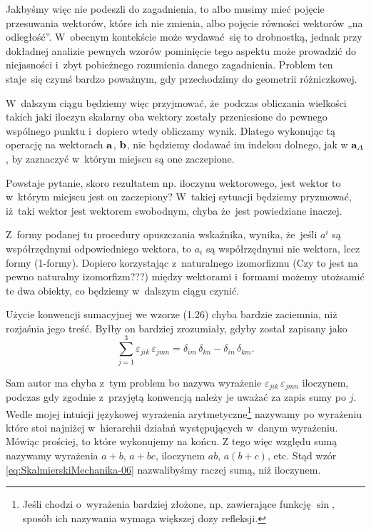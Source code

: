 \documentclass[a4paper,11pt]{article}
\numberwithin{equation}{section}
\begin{document}
Jakbyśmy więc nie podeszli do zagadnienia, to albo musimy mieć pojęcie
przesuwania wektorów, które ich nie zmienia, albo pojęcie równości wektorów
„na odległość”. W~obecnym kontekście może wydawać~się to drobnostką, jednak
przy dokładnej analizie pewnych wzorów pominięcie tego aspektu może
prowadzić do niejasności i~zbyt pobieżnego rozumienia danego zagadnienia.
Problem ten staje~się czymś bardzo poważnym, gdy przechodzimy do geometrii
różniczkowej.

W~dalszym ciągu będziemy więc przyjmować, że~podczas obliczania wielkości
takich jaki iloczyn skalarny oba wektory zostały przeniesione do pewnego
wspólnego punktu i~dopiero wtedy obliczamy wynik. Dlatego wykonując tą
operację na wektorach $\mathbf{a}$, $\mathbf{b}$, nie będziemy dodawać im
indeksu dolnego, jak w $\mathbf{a}_{ A }$, by zaznaczyć w~którym miejscu są
one zaczepione.

Powstaje pytanie, skoro rezultatem np. iloczynu wektorowego, jest wektor to
w~którym miejscu jest on zaczepiony? W~takiej sytuacji będziemy pryzmować,
iż~taki wektor jest wektorem swobodnym, chyba że~jest powiedziane inaczej.

\vspace{\spaceFour}





\noindent
{} Z~formy podanej tu procedury opuszczania wskaźnika, wynika,
że~jeśli $a^{ i }$ są współrzędnymi odpowiedniego wektora, to $a_{ i }$ są
współrzędnymi nie wektora, lecz formy (1-formy). Dopiero korzystając
z~naturalnego izomorfizmu (Czy to jest na pewno naturalny izomorfizm???)
między wektorami i~formami możemy utożsamić te dwa obiekty, co będziemy
w~dalszym ciągu czynić.

\vspace{\spaceFour}





\noindent
{} Użycie konwencji sumacyjnej we wzorze (1.26) chyba bardzie
zaciemnia, niż rozjaśnia jego treść. Byłby on bardziej zrozumiały, gdyby
został zapisany jako
\begin{equation}
  \label{eq:SkalmierskiMechanika-06}
  \sum_{ j = 1 }^{ 3 } \varepsilon_{ j i k } \, \varepsilon_{ j m n }
  = \delta_{ i m } \, \delta_{ k n } - \delta_{ i n } \, \delta_{ k m }.
\end{equation}

Sam autor ma chyba z~tym problem bo nazywa wyrażenie
$\varepsilon_{ j i k } \, \varepsilon_{ j m n }$ iloczynem, podczas gdy zgodnie z~przyjętą
konwencją należy je uważać za zapis sumy po $j$. Wedle mojej intuicji
językowej wyrażenia arytmetyczne\footnote{Jeśli chodzi o~wyrażenia bardziej
  złożone, np. zawierające funkcję $\sin$, sposób ich nazywania wymaga
  większej dozy refleksji.} nazywamy po wyrażeniu które stoi najniżej
w~hierarchii działań występujących w~danym wyrażeniu. Mówiąc prościej,
to które wykonujemy na końcu. Z tego więc względu sumą nazywamy wyrażenia
$a + b$, $a + bc$, iloczynem $ab$, $a ( b + c )$, etc. Stąd wzór
\eqref{eq:SkalmierskiMechanika-06} nazwalibyśmy raczej sumą, niż iloczynem.
\end{document}
